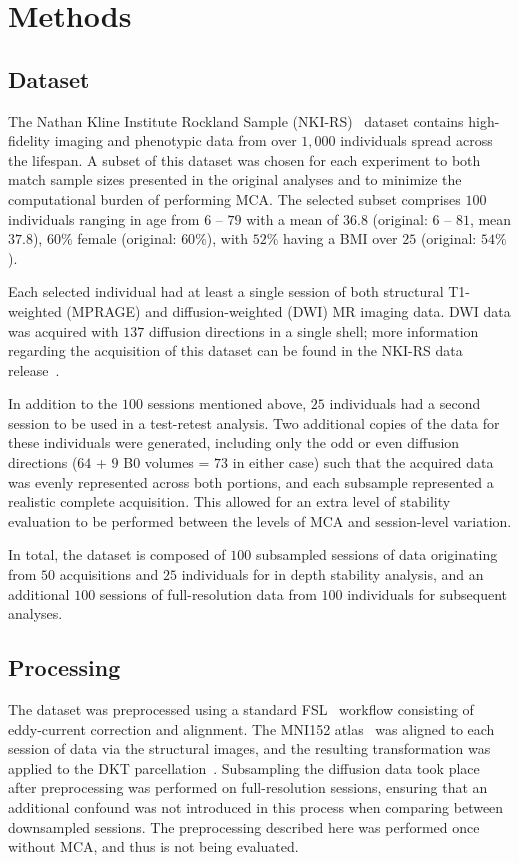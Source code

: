 \documentclass[fleqn,10pt]{SelfArx} %
\begin{document}
\newpage
\section*{Methods}

\subsection*{Dataset}
The Nathan Kline Institute Rockland Sample (NKI-RS)~\cite{Nooner2012-eg} dataset contains high-fidelity imaging and
phenotypic data from over $1,000$ individuals spread across the lifespan. A subset of this dataset was chosen for each
experiment to both match sample sizes presented in the original analyses and to minimize the computational burden of
performing MCA. The selected subset comprises $100$ individuals ranging in age from $6$ – $79$ with a mean of $36.8$
(original: $6$ – $81$, mean $37.8$), $60\%$ female (original: $60\%$), with $52\%$ having a BMI over $25$ (original:
$54\%$).

Each selected individual had at least a single session of both structural T1-weighted (MPRAGE) and diffusion-weighted
(DWI) MR imaging data. DWI data was acquired with $137$ diffusion directions in a single shell; more information regarding the
acquisition of this dataset can be found in the NKI-RS data release~\cite{Nooner2012-eg}.

In addition to the $100$ sessions mentioned above, $25$ individuals had a second session to be used in a test-retest
analysis. Two additional copies of the data for these individuals were generated, including only the odd or even
diffusion directions ($64$ + $9$ B0 volumes = $73$ in either case) such that the acquired data was evenly
represented across both portions, and each subsample represented a realistic complete acquisition. This allowed for
an extra level of stability evaluation to be performed between the levels of MCA and session-level variation.

In total, the dataset is composed of $100$ subsampled sessions of data originating from $50$ acquisitions
and $25$ individuals for in depth stability analysis, and an additional $100$ sessions of full-resolution data from
$100$ individuals for subsequent analyses.


\subsection*{Processing}
The dataset was preprocessed using a standard FSL~\cite{Jenkinson2012-ly} workflow consisting of eddy-current
correction and alignment. The MNI152 atlas~\cite{lancaster2007bias} was aligned to each session of data via the
structural images, and the resulting transformation was applied to the DKT parcellation~\cite{Klein2012-vi}.
Subsampling the diffusion data took place after preprocessing was performed on full-resolution sessions, ensuring that
an additional confound was not introduced in this process when comparing between downsampled sessions. The preprocessing
described here was performed once without MCA, and thus is not being evaluated.
\end{document}
